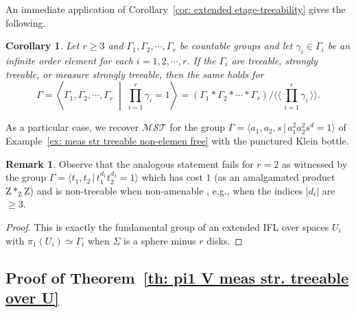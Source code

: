 \documentclass[11pt]{amsart}
\theoremstyle{definition}
\newtheorem{remark}[definition]{Remark}
\theoremstyle{plain}
\newtheorem{corollary}[definition]{Corollary}
\newcommand{\<}{\langle}
\renewcommand{\>}{\rangle}
\newcommand{\Z}{\bm{\mathrm{Z}}}
\newcommand{\MSTreeable}{\bm{\mathscr{MST}}}
\begin{document}
An immediate application of Corollary~\ref{cor: extended etage-treeability} gives the following.
\begin{corollary}\label{cor: a one-rel amalg product}
Let $r\geq 3$ and $\Gamma_1, \Gamma_2, \cdots, \Gamma_r$ be countable groups and let $\gamma_i\in \Gamma_i$ be an infinite order element for each $i=1, 2, \cdots, r$.
If the $\Gamma_i$ are treeable, strongly treeable, or measure strongly treeable, then the same holds for
\[\Gamma=\left\langle \Gamma_1, \Gamma_2, \cdots, \Gamma_r \;\middle\vert\;  \prod_{i=1}^r \gamma_i=1\right\rangle=\left(\Gamma_1*\Gamma_2*\cdots *\Gamma_r\right)/\langle\langle \, \prod_{i=1}^r \gamma_i\, \rangle\rangle.\]
\end{corollary}
As a particular case, we recover $\MSTreeable$ for the group $\Gamma=\langle a_1, a_2, s \,\vert\, a_1^2a_2^2s^d=1\rangle$ of Example~\ref{ex: meas str treeable non-elemen free} with the punctured Klein bottle.

\begin{remark}
Observe that the analogous statement fails for $r=2$ as witnessed by the group $\Gamma=\langle t_1, t_2 \,\vert\,  t_1^{d_1}t_2^{d_2}=1\rangle $
which has cost $1$ (as an amalgamated product $\Z*_{\Z} \Z$) and is non-treeable when non-amenable \cite[Corollary VI.22]{Gab00a}, e.g.,
when the indices $|d_i|$ are $\geq 3$.
\end{remark}

\begin{proof}This is exactly the fundamental group of an extended IFL over spaces $U_i$ with $\pi_1(U_i)\simeq \Gamma_i$ when $\Sigma$ is a sphere minus $r$ disks.\end{proof}
%









\subsection{Proof of Theorem~\ref{th: pi1 V meas str. treeable over U}}\label{subsection:mstproof}
\end{document}
